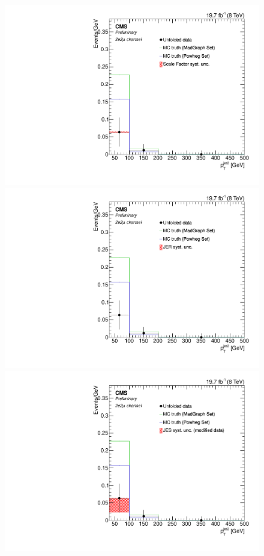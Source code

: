 \begin{figure}[hbtp]
\begin{center}
   \includegraphics[width=0.8\cmsFigWidth]{Figures/Unfolding/Systematics/ZZTo2e2m_PtJet2_SFSq_Mad_fr}
   \includegraphics[width=0.8\cmsFigWidth]{Figures/Unfolding/Systematics/ZZTo2e2m_PtJet2_JER_Mad_fr}
   \includegraphics[width=0.8\cmsFigWidth]{Figures/Unfolding/Systematics/ZZTo2e2m_PtJet2_JES_ModData_Mad_fr}     

\end{center}
\end{figure}
